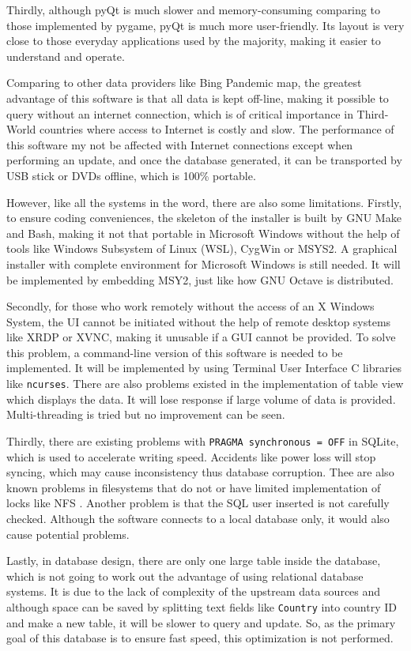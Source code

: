 \documentclass[]{ylarticle}
\begin{document}
Thirdly, although  pyQt is much slower and memory-consuming comparing to those implemented by pygame, pyQt is much more user-friendly. Its layout is very close to those everyday applications used by the majority, making it easier to understand and operate.

Comparing to other data providers like Bing Pandemic map, the greatest advantage of this software is that all data is kept off-line, making it possible to query without an internet connection, which is of critical importance in Third-World countries where access to Internet is costly and slow. The performance of this software my not be affected with Internet connections except when performing an update, and once the database generated, it can be transported by USB stick or DVDs offline, which is 100\% portable.

However, like all the systems in the word, there are also some limitations. Firstly, to ensure coding conveniences, the skeleton of the installer is built by GNU Make and Bash, making it not that portable in Microsoft Windows without the help of tools like Windows Subsystem of Linux (WSL), CygWin or MSYS2. A graphical installer with complete environment for Microsoft Windows is still needed. It will be implemented by embedding MSY2, just like how GNU Octave is distributed.

Secondly, for those who work remotely without the access of an X Windows System, the UI cannot be initiated without the help of remote desktop systems like XRDP or XVNC, making it unusable if a GUI cannot be provided. To solve this problem, a command-line version of this software is needed to be implemented. It will be implemented by using Terminal User Interface C libraries like \verb|ncurses|. There are also problems existed in the implementation of table view which displays the data. It will lose response if large volume of data is provided. Multi-threading is tried but no improvement can be seen.

Thirdly, there are existing problems with \verb|PRAGMA synchronous = OFF| in SQLite, which is used to accelerate writing speed. Accidents like power loss will stop syncing, which may cause inconsistency thus database corruption. Thee are also known problems in filesystems that do not or have limited implementation of locks like NFS \cite{sqlite_err}. Another problem is that the SQL user inserted is not carefully checked. Although the software connects to a local database only, it would also cause potential problems.

Lastly, in database design, there are only one large table inside the database, which is not going to work out the advantage of using relational database systems. It is due to the lack of complexity of the upstream data sources and although space can be saved by splitting text fields like \verb|Country| into country ID and make a new table, it will be slower to query and update. So, as the primary goal of this database is to ensure fast speed, this optimization is not performed.


\end{document}
